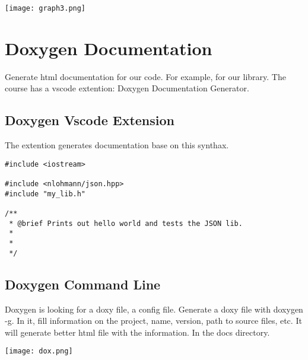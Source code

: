 \begin{center}
    \texttt{[image: graph3.png]}
\end{center}

\section{Doxygen Documentation}

Generate html documentation for our code. For example, for our library. The course has a vscode extention: Doxygen Documentation Generator.

\subsection{Doxygen Vscode Extension}

The extention generates documentation base on this synthax.

\begin{verbatim}
#include <iostream>

#include <nlohmann/json.hpp>
#include "my_lib.h"

/**
 * @brief Prints out hello world and tests the JSON lib.
 *
 *
 */
\end{verbatim}

\subsection{Doxygen Command Line}

Doxygen is looking for a doxy file, a config file. Generate a doxy file with doxygen -g.
In it, fill information on the project, name, version,  path to source files, etc. It will generate better html file with the information.
In the docs directory.

\begin{center}
    \texttt{[image: dox.png]}
\end{center}


